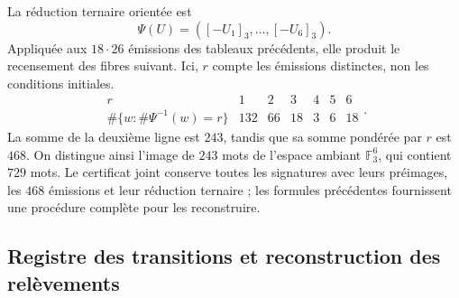 La réduction ternaire orientée est
\[
 \Psi(U)=([-U_1]_3,\ldots,[-U_6]_3).
\]
Appliquée aux $18\cdot26$ émissions des tableaux précédents,
elle produit le recensement des fibres suivant. Ici, $r$ compte les émissions
distinctes, non les conditions initiales.
\begin{equation}
 \begin{array}{c|rrrrrr}
 r&1&2&3&4&5&6\\ \hline
 \#\{w:\#\Psi^{-1}(w)=r\}&132&66&18&3&6&18
 \end{array}.
 \label{iii:nf-censo-ternario}
\end{equation}
La somme de la deuxième ligne est $243$, tandis que sa somme pondérée
par $r$ est $468$. On distingue ainsi l’image de $243$ mots
de l’espace ambiant $\mathbb F_3^6$, qui contient $729$ mots. Le certificat
joint conserve toutes les signatures avec leurs préimages, les $468$
émissions et leur réduction ternaire ; les formules précédentes fournissent
une procédure complète pour les reconstruire.

\subsection{Registre des transitions et reconstruction des relèvements}

